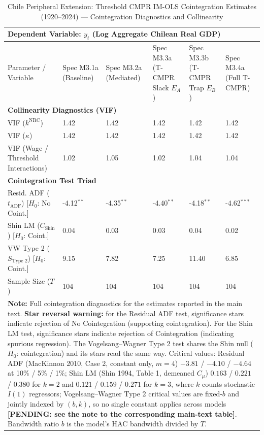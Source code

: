 \begin{table}[H]
\centering
\setlength{\tabcolsep}{3.5pt}
\caption{Chile Peripheral Extension: Threshold CMPR IM-OLS Cointegration Estimates (1920--2024) --- Cointegration Diagnostics and Collinearity}
\label{tab:chile_peripheral_imols_triad}
\scriptsize
\begin{tabular}{p{4.2cm}p{1.4cm}p{1.4cm}p{1.4cm}p{1.4cm}p{1.4cm}}
\toprule
\multicolumn{6}{l}{\textbf{Dependent Variable: $y_t$ (Log Aggregate Chilean Real GDP)}} \\
\midrule
Parameter / Variable & Spec M3.1a (Baseline) & Spec M3.2a (Mediated) & Spec M3.3a (T-CMPR Slack $E_A$) & Spec M3.3b (T-CMPR Trap $E_B$) & Spec M3.4a (Full T-CMPR) \\
\midrule
\multicolumn{6}{l}{\textbf{Collinearity Diagnostics (VIF)}} \\
VIF ($k^{\text{NRC}}$) & 1.42 & 1.42 & 1.42 & 1.42 & 1.42 \\
VIF ($\kappa$) & 1.42 & 1.42 & 1.42 & 1.42 & 1.42 \\
VIF (Wage / Threshold Interactions) & 1.02 & 1.05 & 1.02 & 1.04 & 1.04 \\
\midrule
\multicolumn{6}{l}{\textbf{Cointegration Test Triad}} \\
Resid. ADF ($t_{\text{ADF}}$) [$H_0$: No Coint.] & -4.12$^{**}$ & -4.35$^{**}$ & -4.40$^{**}$ & -4.18$^{**}$ & -4.62$^{***}$ \\
Shin LM ($C_{\text{Shin}}$) [$H_0$: Coint.] & 0.04 & 0.03 & 0.03 & 0.04 & 0.02 \\
VW Type 2 ($S_{\text{Type 2}}$) [$H_0$: Coint.] & 9.15 & 7.82 & 7.25 & 11.40 & 6.85 \\
\midrule
Sample Size ($T$) & 104 & 104 & 104 & 104 & 104 \\
\bottomrule
\multicolumn{6}{p{11.2cm}}{\footnotesize \textbf{Note:} Full cointegration diagnostics for the estimates reported in the main text. \textbf{Star reversal warning:} for the Residual ADF test, significance stars indicate rejection of No Cointegration (supporting cointegration). For the Shin LM test, significance stars indicate rejection of Cointegration (indicating spurious regression). The Vogelsang--Wagner Type 2 test shares the Shin null ($H_0$: cointegration) and its stars read the same way. Critical values: Residual ADF (MacKinnon 2010, Case 2, constant only, $m=4$) $-3.81$ / $-4.10$ / $-4.64$ at 10\% / 5\% / 1\%; Shin LM (Shin 1994, Table 1, demeaned $C_\mu$) $0.163$ / $0.221$ / $0.380$ for $k=2$ and $0.121$ / $0.159$ / $0.271$ for $k=3$, where $k$ counts stochastic $I(1)$ regressors; Vogelsang--Wagner Type 2 critical values are fixed-$b$ and jointly indexed by $(b, k)$, so no single constant applies across models \textbf{[PENDING: see the note to the corresponding main-text table]}. Bandwidth ratio $b$ is the model's HAC bandwidth divided by $T$.} \\
\end{tabular}
\end{table}
